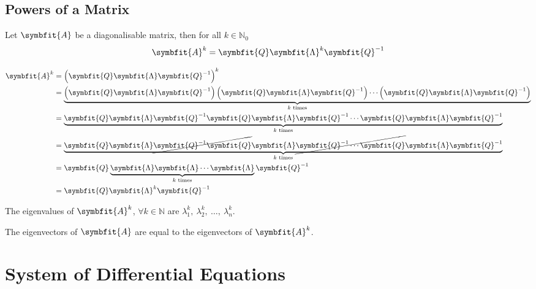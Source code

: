 \documentclass{article}
\begin{document}
	\subsection{Powers of a Matrix}
	\begin{theorem}
		Let $\symbfit{A}$ be a diagonalisable matrix, then for all $k \in \mathbb{N}_0$
		\begin{equation*}
			\symbfit{A}^k = \symbfit{Q} \symbfit{\Lambda}^k \symbfit{Q}^{-1}
		\end{equation*}
	\end{theorem}
	\begin{solutionF}[Proof]
		\begin{align*}
			\symbfit{A}^k &= \left( \symbfit{Q} \symbfit{\Lambda} \symbfit{Q}^{-1} \right)^k \\
			&= \underbrace{\left( \symbfit{Q} \symbfit{\Lambda} \symbfit{Q}^{-1} \right)\left( \symbfit{Q} \symbfit{\Lambda} \symbfit{Q}^{-1} \right)\cdots\left( \symbfit{Q} \symbfit{\Lambda} \symbfit{Q}^{-1} \right)}_{\text{$k$ times}} \\
			&= \underbrace{\symbfit{Q} \symbfit{\Lambda} \symbfit{Q}^{-1} \symbfit{Q} \symbfit{\Lambda} \symbfit{Q}^{-1} \cdots \symbfit{Q} \symbfit{\Lambda} \symbfit{Q}^{-1} }_{\text{$k$ times}} \\
			&= \underbrace{\symbfit{Q} \symbfit{\Lambda} \cancel{\symbfit{Q}^{-1} \symbfit{Q}} \symbfit{\Lambda} \cancel{\symbfit{Q}^{-1} \cdots \symbfit{Q}} \symbfit{\Lambda} \symbfit{Q}^{-1} }_{\text{$k$ times}} \\
			&= \symbfit{Q} \underbrace{ \symbfit{\Lambda} \symbfit{\Lambda} \cdots \symbfit{\Lambda} }_{\text{$k$ times}}\symbfit{Q}^{-1} \\
			&= \symbfit{Q} \symbfit{\Lambda}^k\symbfit{Q}^{-1}
		\end{align*}
	\end{solutionF}
	\begin{theorem}
		The eigenvalues of $\symbfit{A}^k$, $\forall k \in \mathbb{N}$ are $\lambda_1^k,\: \lambda_2^k,\: \dots,\: \lambda_n^k$.
	\end{theorem}
	\begin{theorem}
		The eigenvectors of $\symbfit{A}$ are equal to the eigenvectors of $\symbfit{A}^k$.
	\end{theorem}
	\newpage
\section{System of Differential Equations}
\end{document}
